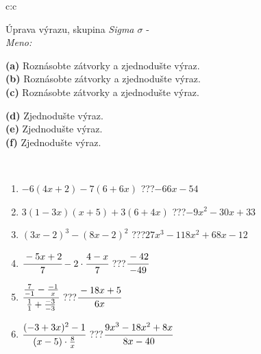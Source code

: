 \documentclass[10pt]{report}
\begin{document}
\newpage
\thispagestyle{empty}
\begin{tabular}{c:c}
\begin{minipage}[c][104.5mm][t]{0.5\linewidth}
\begin{center}
\vspace{7mm}
{\huge Úprava výrazu, skupina \textit{Sigma $\sigma$} -}\\[5mm]
\textit{Meno:}\phantom{xxxxxxxxxxxxxxxxxxxxxxxxxxxxxxxxxxxxxxxxxxxxxxxxxxxxxxxxxxxxxxxxx}\\[5mm]
\begin{minipage}{0.95\linewidth}
\begin{center}
{\small \begin{minipage}{0.6\textwidth}
\textbf{(a)} Roznásobte zátvorky a zjednodušte výraz. \\[1mm]
\textbf{(b)} Roznásobte zátvorky a zjednodušte výraz. \\[1mm]
\textbf{(c)} Roznásobte zátvorky a zjednodušte výraz.
\end{minipage} \begin{minipage}{0.39\textwidth}
\textbf{(d)} Zjednodušte výraz. \\[1mm]
\textbf{(e)} Zjednodušte výraz. \\[1mm]
\textbf{(f)} Zjednodušte výraz.
\end{minipage}
}
\end{center}
\end{minipage}
\\[4mm]
\begin{minipage}{0.79\linewidth}
\begin{center}
\begin{varwidth}{\linewidth}
\begin{enumerate}
\normalsize
\item $-6(4x+2)-7(6+6x)$\quad \dotfill\; ???\;\dotfill \quad $-66x-54$
\item $3(1-3x)(x+5)+3(6+4x)$\quad \dotfill\; ???\;\dotfill \quad $-9x^2-30x+33$
\item $(3x-2)^3-(8x-2)^2$\quad \dotfill\; ???\;\dotfill \quad $27x^3-118x^2+68x-12$
\item $\cfrac{-5x+2}{7}-2\cdot\cfrac{4-x}{7}$\quad \dotfill\; ???\;\dotfill \quad $\cfrac{-42}{-49}$
\item $\cfrac{\frac{7}{-1}-\frac{-1}{x}}{\frac{1}{1}+\frac{-3}{-3}}$\quad \dotfill\; ???\;\dotfill \quad $\cfrac{-18x+5}{6x}$
\item $\cfrac{(-3+3x)^2-1}{(x-5)\cdot\frac{8}{x}}$\quad \dotfill\; ???\;\dotfill \quad $\cfrac{9x^3-18x^2+8x}{8x-40}$

\end{enumerate}
\end{varwidth}
\end{center}
\end{minipage}
\end{center}
\end{minipage}
\end{tabular}
\end{document}
